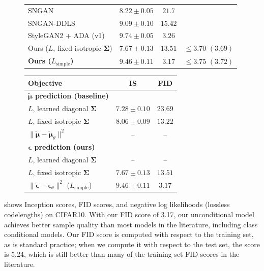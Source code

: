 \documentclass{article}
\newcommand{\bepsilon}{{\boldsymbol{\epsilon}}}
\newcommand{\bmu}{{\boldsymbol{\mu}}}
\newcommand{\bSigma}{{\boldsymbol{\Sigma}}}
\begin{document}
\begin{figure}
\begin{minipage}{0.55\textwidth}
\begin{tabular}{lccc}
    SNGAN~\citep{miyato2018spectral} & $8.22\!\pm\!0.05$ & $21.7$ \\
    SNGAN-DDLS~\citep{che2020your} & $9.09\!\pm\!0.10$ & $15.42$ \\
    StyleGAN2 + ADA (v1)~\citep{karras2020training} & $\mathbf{9.74} \pm 0.05$ & $3.26$ \\
    Ours ($L$, fixed isotropic $\bSigma$) & $7.67\!\pm\!0.13$ & $13.51$ & $\leq 3.70 $ $(3.69)$ \\
    \textbf{Ours ($L_\mathrm{simple}$)} & $9.46\!\pm\!0.11$ & $\mathbf{3.17}$ & $\leq 3.75$ $(3.72)$\\ 
    \bottomrule
  \end{tabular}
 \end{minipage}\hfill
 \begin{minipage}{0.4\textwidth}
 \label{table:loss_ablation}
  \centering \scriptsize
  \vspace{-1em}
  \begin{tabular}{lcc}
    \toprule
    Objective &  IS & FID  \\
    \midrule
    \textbf{$\tilde\bmu$ prediction (baseline)} \\
    \midrule
    $L$, learned diagonal $\bSigma$ & $7.28\!\pm\!0.10$ & $23.69$  \\
    $L$, fixed isotropic $\bSigma$ & $8.06\!\pm\!0.09$ & $13.22$     \\
    $\|\tilde\bmu - \tilde\bmu_\theta \|^2$ & -- & --  \\
    \midrule
    \textbf{$\bepsilon$ prediction (ours)} \\
    \midrule
    $L$, learned diagonal $\bSigma$ &  -- & -- \\
    $L$, fixed isotropic $\bSigma$ &   $7.67\!\pm\!0.13$ & $13.51$   \\
    $\|\tilde\bepsilon - \bepsilon_\theta \|^2$ ($L_\mathrm{simple}$) & $\mathbf{9.46\!\pm\!0.11}$ & $\mathbf{3.17}$ \\
    \bottomrule
  \end{tabular}
 \end{minipage}
\vspace{-1em}
\end{figure}

 shows Inception scores, FID scores, and negative log likelihoods (lossless codelengths) on CIFAR10. With our FID score of 3.17, our unconditional model achieves better sample quality than most models in the literature, including class conditional models. Our FID score is computed with respect to the training set, as is standard practice; when we compute it with respect to the test set, the score is 5.24, which is still better than many of the training set FID scores in the literature.
\end{document}
